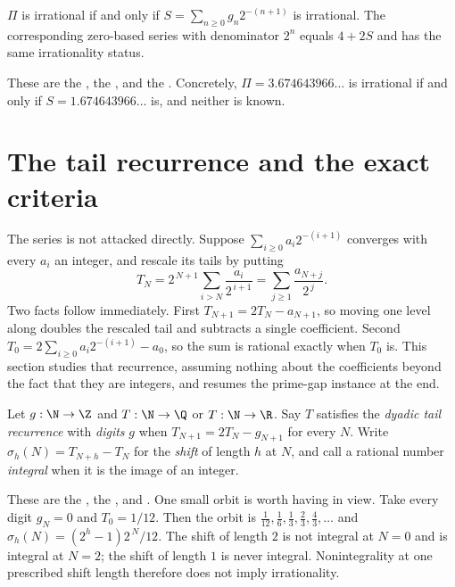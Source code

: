 \documentclass[11pt]{article}
\begin{document}
\begin{corollary}\label{long251:res:irr-equivalence}
$\Pi$ is irrational if and only if $S=\sum_{n\ge0}g_n2^{-(n+1)}$ is irrational.
The corresponding zero-based series with denominator $2^n$ equals $4+2S$ and
has the same irrationality status.
\end{corollary}

\noindent These are the
, the
, and the
.  Concretely, $\Pi=3.674643966\ldots$ is irrational
if and only if $S=1.674643966\ldots$ is, and neither is known.

\section{The tail recurrence and the exact criteria}\label{long251:sec:tail}

The series is not attacked directly.  Suppose $\sum_{i\ge0}a_i2^{-(i+1)}$
converges with every $a_i$ an integer, and rescale its tails by putting
\[
 T_N=2^{\,N+1}\sum_{i>N}\frac{a_i}{2^{\,i+1}}
    =\sum_{j\ge1}\frac{a_{N+j}}{2^{\,j}} .
\]
Two facts follow immediately.  First $T_{N+1}=2T_N-a_{N+1}$, so moving one
level along doubles the rescaled tail and subtracts a single coefficient.
Second $T_0=2\sum_{i\ge0}a_i2^{-(i+1)}-a_0$, so the sum is rational exactly
when $T_0$ is.  This section studies that recurrence, assuming nothing about
the coefficients beyond the fact that they are integers, and resumes the
prime-gap instance at the end.

\begin{definition}\label{long251:def:rec}
Let $g:\N\to\Z$ and $T:\N\to\Q$ or $T:\N\to\R$.  Say $T$ satisfies the
\emph{dyadic tail recurrence} with \emph{digits} $g$ when
$T_{N+1}=2T_N-g_{N+1}$ for every $N$.  Write $\sigma_h(N)=T_{N+h}-T_N$ for the
\emph{shift} of length $h$ at $N$, and call a rational number \emph{integral}
when it is the image of an integer.
\end{definition}

\noindent These are the
, the
, and
.
One small orbit is worth having in view.  Take every digit $g_N=0$ and
$T_0=1/12$.  Then the orbit is
$\tfrac1{12},\tfrac16,\tfrac13,\tfrac23,\tfrac43,\ldots$ and
$\sigma_h(N)=(2^{h}-1)2^{\,N}/12$.  The shift of length $2$ is not integral at
$N=0$ and is integral at $N=2$; the shift of length $1$ is never integral.
Nonintegrality at one prescribed shift length therefore does not imply
irrationality.
\end{document}
